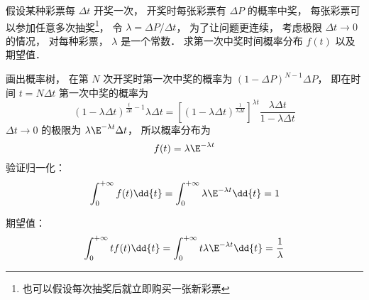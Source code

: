 
假设某种彩票每 $\Delta t$ 开奖一次， 开奖时每张彩票有 $\Delta P$ 的概率中奖， 每张彩票可以参加任意多次抽奖\footnote{也可以假设每次抽奖后就立即购买一张新彩票}， 令 $\lambda = {\Delta P}/{\Delta t}$， 为了让问题更连续， 考虑极限 $\Delta t\to 0$ 的情况， 对每种彩票， $\lambda$ 是一个常数． 求第一次中奖时间概率分布 $f(t)$ 以及期望值．

画出概率树， 在第 $N$ 次开奖时第一次中奖的概率为 $(1-\Delta P)^{N-1} \Delta P$， 即在时间 $t = N\Delta t$ 第一次中奖的概率为
\begin{equation}
(1-\lambda\Delta t)^{\frac{t}{\Delta t}-1} \lambda\Delta t
= [(1-\lambda\Delta t)^{\frac{1}{\lambda\Delta t}}]^{\lambda t} \frac{\lambda\Delta t}{1-\lambda\Delta t}
\end{equation}
$\Delta t\to 0$ 的极限为 $\lambda\E^{-\lambda t}\Delta t$， 所以概率分布为
\begin{equation}
f(t) = \lambda\E^{-\lambda t}
\end{equation}
验证归一化：
\begin{equation}
\int_0^{+\infty} f(t) \dd{t} = \int_0^{+\infty} \lambda\E^{-\lambda t} \dd{t} = 1
\end{equation}

期望值：
\begin{equation}
\int_0^{+\infty} t f(t) \dd{t} = \int_0^{+\infty}t \lambda\E^{-\lambda t} \dd{t} = \frac{1}{\lambda}
\end{equation}
